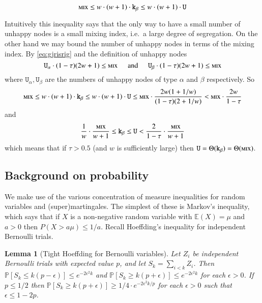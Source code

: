 \documentclass[11pt]{article}
\theoremstyle{plain}
\newtheorem{lem}[thm]{Lemma}
\numberwithin{equation}{subsection}
\newcommand{\mix}{\textsc{mix}}
\newcommand{\unhap}{\mathtt{U}}
\DeclareRobustCommand{\proba}[2][{\mbox{$\mathbb{P}$}}]{\ensuremath {#1} [ {#2} ]}
\begin{document}
\begin{equation*}
\mix \leq w\cdot (w+1) \cdot \mathtt{k}_{\beta} \leq w\cdot (w+1) \cdot \unhap
\end{equation*}

Intuitively this inequality says that the only way to 
have a small number of unhappy nodes is a small mixing index, i.e.\ a large
degree of segregation. On the other hand we may bound the number of 
unhappy nodes in terms of the mixing index. By
\eqref{eq:gjrisrig} and the definition of unhappy nodes 
\begin{equation*}
\unhap_{\alpha}\cdot (1-\tau)(2w+1)\leq  \mix\hspace{0.5cm}
\textrm{and}\hspace{0.5cm}\unhap_{\beta}\cdot (1-\tau)(2w+1)\leq \mix
\end{equation*}
where $\unhap_{\alpha}, \unhap_{\beta}$ 
are the numbers of unhappy nodes of type $\alpha$ and $\beta$ respectively.
So
\[
\mix \leq w\cdot (w+1) \cdot \mathtt{k}_{\beta} \leq w\cdot (w+1) \cdot \unhap
\leq \mix\cdot \frac{2w(1+1/w)}{(1-\tau)(2+1/w)}< \mix\cdot \frac{2w}{1-\tau}
\]
and
\[
\frac{1}{w}\cdot \frac{\mix}{w+1} \leq \mathtt{k}_{\beta} \leq\unhap< \frac{2}{1-\tau}\cdot \frac{\mix}{w+1}
\]
which means that if $\tau>0.5$ (and $w$ is sufficiently large) 
then $\unhap =\Theta(\texttt{k}_{\beta})=\Theta(\mix)$.


\subsection{Background on probability}
We make use of the various concentration of measure 
inequalities for random variables and (super)martingales.
The simplest of these is Markov's inequality,
which says that if $X$ is a non-negative random variable with 
$\mathbb{E}(X)=\mu$ and $a>0$ then $P(X>a\mu)\leq 1/a$.
Recall Hoeffding's inequality for independent Bernoulli trials.

\begin{lem}[Tight Hoeffding for Bernoulli variables]\label{le:hoeffdingber}\label{le:tighthoeffd}
Let $Z_i$ be independent Bernoulli trials with expected value $p$, and let 
$S_k=\sum_{i<k} Z_i$. Then 
$\proba{S_k\leq k(p-\epsilon)}\leq e^{-2\epsilon^2 k}$
and 
$\proba{S_k\geq k(p+\epsilon)}\leq e^{-2\epsilon^2 k}$
for each $\epsilon>0$. If $p\leq 1/2$
then $\proba{S_k\geq k(p+\epsilon)}\geq 1/4\cdot e^{-2\epsilon^2 k/p}$
for each $\epsilon>0$ such that $\epsilon\leq 1-2p$.
\end{lem}
\end{document}
